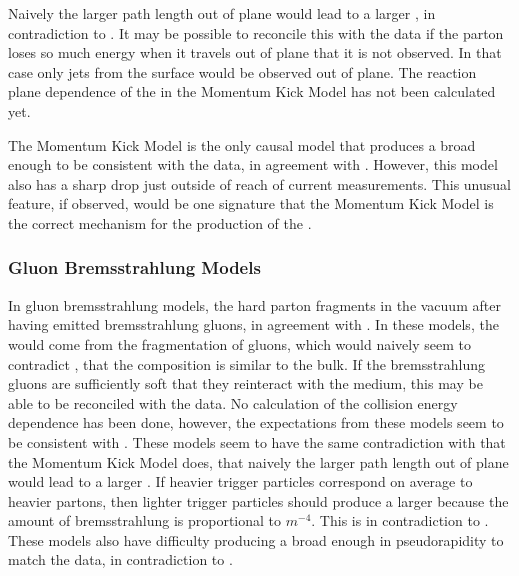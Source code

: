Naively the larger path length out of plane would lead to a larger \ridge, in contradiction to .  It may be possible to reconcile this with the data if the parton loses so much energy when it travels out of plane that it is not observed.  In that case only jets from the surface would be observed out of plane.  The reaction plane dependence of the \ridge in the Momentum Kick Model has not been calculated yet.

The Momentum Kick Model is the only causal model that produces a \ridge broad enough to be consistent with the data, in agreement with .  However, this model also has a sharp drop just outside of reach of current measurements.  This unusual feature, if observed, would be one signature that the Momentum Kick Model is the correct mechanism for the production of the \ridge.

\subsubsection{Gluon Bremsstrahlung Models}
In gluon bremsstrahlung models, the hard parton fragments in the vacuum after having emitted bremsstrahlung gluons, in agreement with .  In these models, the \ridge would come from the fragmentation of gluons, which would naively seem to contradict , that the \ridge composition is similar to the bulk.  If the bremsstrahlung gluons are sufficiently soft that they reinteract with the medium, this may be able to be reconciled with the data.  No calculation of the collision energy dependence has been done, however, the expectations from these models seem to be consistent with .  These models seem to have the same contradiction with  that the Momentum Kick Model does, that naively the larger path length out of plane would lead to a larger \ridge.  If heavier trigger particles correspond on average to heavier partons, then lighter trigger particles should produce a larger \ridge because the amount of bremsstrahlung is proportional to $m^{-4}$.  This is in contradiction to .  These models also have difficulty producing a \ridge broad enough in pseudorapidity to match the data, in contradiction to .

